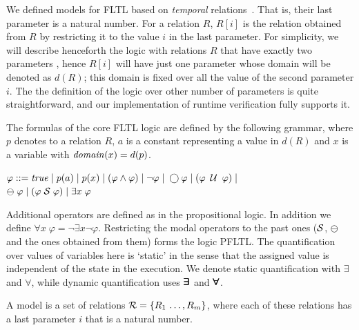 We defined models for FLTL based on {\em temporal} relations~\cite{Chomicki}. That is,
their last parameter
is a natural number. For a relation $R$, $R [ i ]$ is the relation obtained from $R$ by
restricting it to the value $i$ in the last parameter. For simplicity, we will describe henceforth
the logic with relations $R$ that have exactly two parameters
, hence $R [ i ]$ will have just one parameter whose domain will be denoted as $d ( R )$; this domain is fixed over all the value of the second parameter $i$. The the definition of the logic over other number of parameters is quite straightforward, and our implementation of runtime verification fully supports it.



The formulas of the core FLTL logic are 
defined by the following grammar,
where $p$ denotes to a relation $R$,
$a$ is a constant representing a value in $d ( R )$ and $x$ is a variable with $\mathit{domain} ( x ) = d ( p )$.
\begin{center}
$\varphi ::= \mathit{true}  \; | \;
    p ( a ) \; | \;
    p ( x ) \; | \;
    ( \varphi \wedge \varphi ) \;  |   \;
   \neg \varphi \; | \;
   \bigcirc \varphi \; | \; 
   ( \varphi \; \mathbin{\mathcal{U}} \; \varphi ) \; | $ \\
   $ \ominus \; \varphi \; | \;
    ( \varphi  \; {\cal S}  \; \varphi ) \; | \;
    \exists x \; \varphi$
\end{center}


\noindent 

Additional operators are defined as in the propositional logic. In addition we define
$\forall x \; \varphi = \neg \exists x \neg \varphi$.
Restricting the modal operators to the past ones
(${\cal S}$, $\ominus$ and the ones obtained from them) 
forms the logic PFLTL.
The quantification over values of variables here is `static' in the sense that
the assigned value is independent of the state in the execution. We
denote static quantification with $\exists$ and $\forall$, while
dynamic quantification uses $\bm{\exists}\kern-0.6em\bm{\exists}$ and $\bm{\forall}\kern-0.6em\bm{\forall}$.

A model is a set of
 relations ${\cal R} = \{ R_1 \, \ldots , R_m \}$, where each of these relations has a last parameter $i$ that is a natural number. 
 
